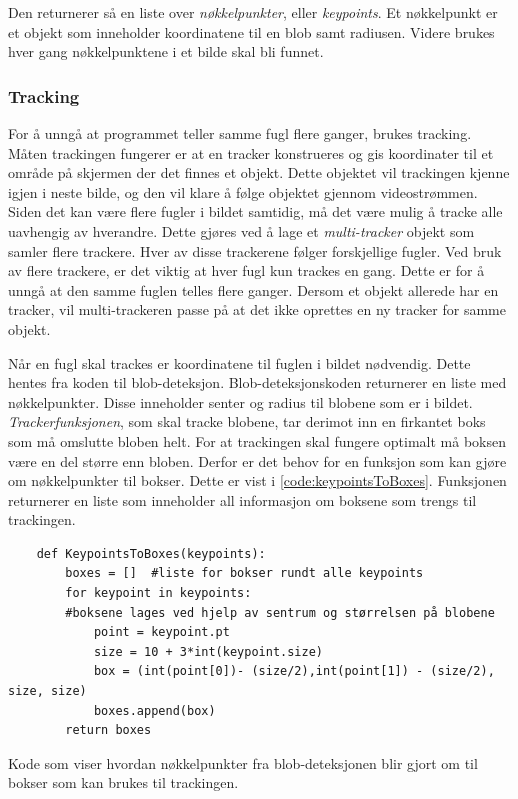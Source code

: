 Den returnerer så en liste over \textit{nøkkelpunkter}, eller \textit{keypoints}. 
Et nøkkelpunkt er et objekt som inneholder koordinatene til en blob samt radiusen. 
Videre brukes  hver gang nøkkelpunktene i et bilde skal bli funnet.

\subsubsection{Tracking}\label{sec:impl:programvare:tracking}
For å unngå at programmet teller samme fugl flere ganger, brukes tracking. 
Måten trackingen fungerer er at en tracker konstrueres og gis koordinater til et område på skjermen der det finnes et objekt. 
Dette objektet vil trackingen kjenne igjen i neste bilde, og den vil klare å følge objektet gjennom videostrømmen.
Siden det kan være flere fugler i bildet samtidig, må det være mulig å tracke alle uavhengig av hverandre. 
Dette gjøres ved å lage et \textit{multi-tracker} objekt som samler flere trackere. 
Hver av disse trackerene følger forskjellige fugler.
Ved bruk av flere trackere, er det viktig at hver fugl kun trackes en gang. 
Dette er for å unngå at den samme fuglen telles flere ganger. 
Dersom et objekt allerede har en tracker, vil multi-trackeren passe på at det ikke oprettes en ny tracker for samme objekt.


Når en fugl skal trackes er koordinatene til fuglen i bildet nødvendig. 
Dette hentes fra koden til blob-deteksjon. 
Blob-deteksjonskoden returnerer en liste med nøkkelpunkter. 
Disse inneholder senter og radius til blobene som er i bildet.
\textit{Trackerfunksjonen}, som skal tracke blobene, tar derimot inn en firkantet boks som må omslutte bloben helt.
For at trackingen skal fungere optimalt må boksen være en del større enn bloben.
Derfor er det behov for en funksjon som kan gjøre om nøkkelpunkter til bokser. 
Dette er vist i \autoref{code:keypointsToBoxes}. 
Funksjonen  returnerer en liste som inneholder all informasjon om boksene som trengs til trackingen.

\begin{listing}[!htb]
\begin{verbatim}
    def KeypointsToBoxes(keypoints):
        boxes = []  #liste for bokser rundt alle keypoints 
        for keypoint in keypoints:
        #boksene lages ved hjelp av sentrum og størrelsen på blobene
            point = keypoint.pt
            size = 10 + 3*int(keypoint.size)
            box = (int(point[0])- (size/2),int(point[1]) - (size/2), size, size)
            boxes.append(box)
        return boxes
\end{verbatim}
\caption{Kode som viser hvordan nøkkelpunkter fra blob-deteksjonen blir gjort om til bokser som kan brukes til trackingen.}
\label{code:keypointsToBoxes}
\end{listing}

